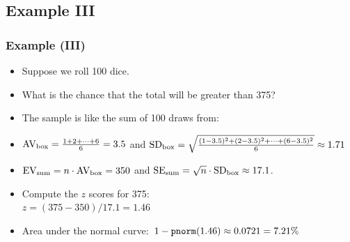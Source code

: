 \documentclass[t]{beamer}
\begin{document}
\subsection{Example III}
\begin{frame}
\frametitle{Example (III)}

\footnotesize

\begin{itemize}
\item Suppose we roll 100 dice.  
\item<2-> What is the chance that the total will be greater than 375?
\item<3-> The sample is like the sum of 100 draws from:
\begin{center}
\vspace{2pt}
\end{center}
\item<4-> $\mbox{AV}_{\mbox{\scriptsize box}}=\frac{1 + 2 + \cdots + 6}{6} = 3.5$
and $\mbox{SD}_{\mbox{\scriptsize box}}=\sqrt{\frac{(1-3.5)^2 + (2-3.5)^2+\cdots + (6-3.5)^2}{6}}
   \approx 1.71$
\item<5-> $\mbox{EV}_{\mbox{\scriptsize sum}}=n\cdot \mbox{AV}_{\mbox{\scriptsize box}}=350$
 and $\mbox{SE}_{\mbox{\scriptsize sum}}=
    \sqrt{n}\cdot \mbox{SD}_{\mbox{\scriptsize box}}\approx 17.1$.
\item<6-> Compute the $z$ scores for 375:\\
   $z=(375 - 350)/17.1 = 1.46$
\item<7->  Area under the normal curve:~{\scriptsize $1-\mbox{\texttt{pnorm}}(1.46) \approx
   0.0721=7.21\%$}
\end{itemize}
\label{lastpage}
\end{frame}
\end{document}
